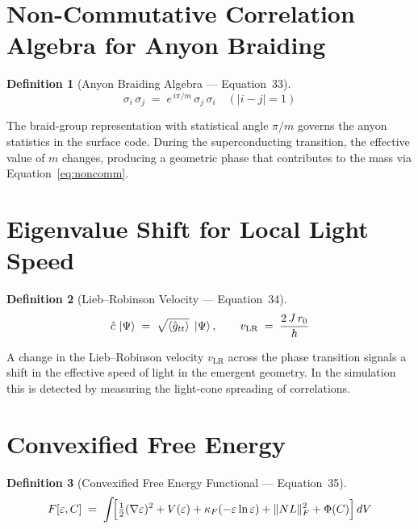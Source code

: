 \documentclass[11pt,a4paper]{article}
\newtheorem{definition}{Definition}[section]
\theoremstyle{remark}
\begin{document}
\section{Non-Commutative Correlation Algebra for Anyon Braiding}
\label{sec:eq33}

\begin{definition}[Anyon Braiding Algebra --- Equation~33]
\begin{equation}\label{eq:anyon}
    \sigma_i\,\sigma_j \;=\; e^{\,i\pi/m}\,\sigma_j\,\sigma_i \quad (|i-j|=1)
\end{equation}
\end{definition}

The braid-group representation with statistical angle $\pi/m$ governs the anyon statistics in the surface code.  During the superconducting transition, the effective value of $m$ changes, producing a geometric phase that contributes to the mass via Equation~\eqref{eq:noncomm}.

\section{Eigenvalue Shift for Local Light Speed}
\label{sec:eq34}

\begin{definition}[Lieb--Robinson Velocity --- Equation~34]
\begin{equation}\label{eq:liebrobinson}
    \hat{c}\,\ket{\Psi} \;=\; \sqrt{\expval{\hat{g}_{tt}}}\;\ket{\Psi}, \qquad
    v_{\text{LR}} \;=\; \frac{2\,J\,r_0}{\hbar}
\end{equation}
\end{definition}

A change in the Lieb--Robinson velocity $v_{\text{LR}}$ across the phase transition signals a shift in the effective speed of light in the emergent geometry.  In the simulation this is detected by measuring the light-cone spreading of correlations.

\section{Convexified Free Energy}
\label{sec:eq35}

\begin{definition}[Convexified Free Energy Functional --- Equation~35]
\begin{equation}\label{eq:freeenergy}
    F[\varepsilon,C] \;=\; \int\!\Bigl[
        \tfrac{1}{2}(\nabla\varepsilon)^2
        + V(\varepsilon)
        + \kappa_F(-\varepsilon\ln\varepsilon)
        + \|NL\|_F^2
        + \Phi(C)
    \Bigr]\, dV
\end{equation}
\end{definition}
\end{document}

